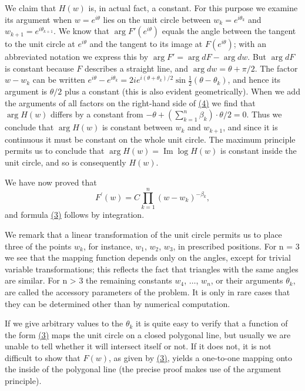 We claim that $H(w)$ is, in actual fact, a constant. For this purpose we examine its argument when $w = e^{i\theta}$ lies on the unit circle between $w_k = e^{i\theta_k}$ and $w_{k+1} = e^{i\theta_{k+1}}$. We know that $\arg F'(e^{i\theta})$ equals the angle between the tangent to the unit circle at $e^{i\theta}$ and the tangent to its image at $F(e^{i\theta})$; with an abbreviated notation we express this by $\arg F' = \arg dF - \arg dw$. But $\arg dF$ is constant because $F$ describes a straight line, and $\arg dw = \theta + \pi/2$. The factor $w - w_k$ can be written $e^{i\theta} - e^{i\theta_k} = 2ie^{i(\theta + \theta_k)/2} \sin \frac{1}{2} (\theta - \theta_k)$, and hence its argument is $\theta/2$ plus a constant (this is also evident geometrically). When we add the arguments of all factors on the right-hand side of \hyperref[eq:6.4]{(4)} we find that $\arg H(w)$ differs by a constant from $-\theta + \left( \sum_{k=1}^{n} \beta_k \right) \cdot \theta/2 = 0$. Thus we conclude that $\arg H(w)$ is constant between $w_k$ and $w_{k+1}$, and since it is continuous it must be constant on the whole unit circle. The maximum principle permits us to conclude that $\arg H(w) = \operatorname{Im} \log H(w)$ is constant inside the unit circle, and so is consequently $H(w)$.

We have now proved that
\begin{equation*}
F ^ {\prime} (w) = C \prod_ {k = 1} ^ {n} (w - w _ {k}) ^ {- \beta_ {k}},
\end{equation*}
and formula \hyperref[eq:6.3]{(3)} follows by integration.

We remark that a linear transformation of the unit circle permits us to place three of the points $w_{k}$, for instance, $w_{1}$, $w_{2}$, $w_{3}$, in prescribed positions. For n = 3 we see that the mapping function depends only on the angles, except for trivial variable transformations; this reflects the fact that triangles with the same angles are similar. For n > 3 the remaining constants $w_{4}$, $\ldots$, $w_{n}$, or their arguments $\theta_{k}$, are called the accessory parameters of the problem. It is only in rare cases that they can be determined other than by numerical computation.

If we give arbitrary values to the $\theta_{k}$ it is quite easy to verify that a function of the form \hyperref[eq:6.3]{(3)} maps the unit circle on a closed polygonal line,
but usually we are unable to tell whether it will intersect itself or not. If it does not, it is not difficult to show that $F(w)$, as given by \hyperref[eq:6.3]{(3)}, yields a one-to-one mapping onto the inside of the polygonal line (the precise proof makes use of the argument principle).

